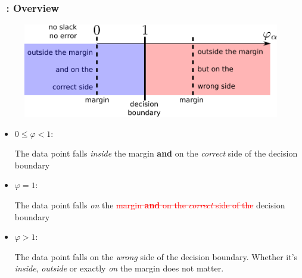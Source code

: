\begin{frame}\frametitle{\subsubsecname~: Overview}

\begin{figure}[h]
	\centering
	\includegraphics[width=0.6\linewidth]{img/slack_values}%
    \label{fig:unconstrained}%
\end{figure}

\begin{itemize}
\item $0 \le \varphi < 1$:

The data point falls \emph{inside} the margin \textbf{and} on the \emph{correct} side of the decision boundary 


\item $\varphi = 1$:

The data point falls \emph{on} the \textcolor{red}{\st{margin \textbf{and} on the \emph{correct} side of the}} decision boundary 


\item $\varphi > 1$:

The data point falls on the \emph{wrong} side of the decision boundary. Whether it's \emph{inside}, \emph{outside} or exactly \emph{on} the margin does not matter.

\end{itemize}

\end{frame}


